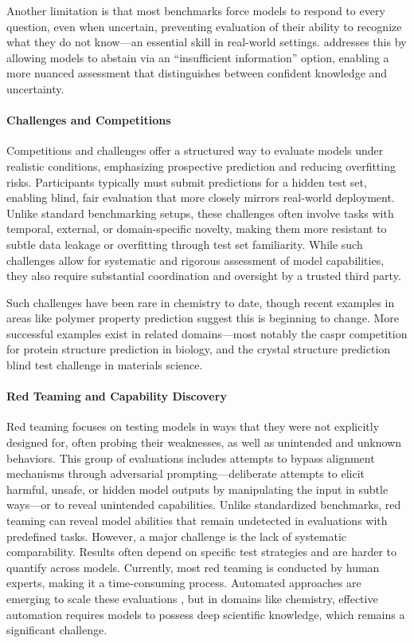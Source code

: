 Another limitation is that most benchmarks force models to respond to every question, even when uncertain, preventing evaluation of their ability to recognize what they do not know---an essential skill in real-world settings.  addresses this by allowing models to abstain via an \enquote{insufficient information} option, enabling a more nuanced assessment that distinguishes between confident knowledge and uncertainty.


\paragraph{Challenges and Competitions}
Competitions and challenges offer a structured way to evaluate models under realistic conditions, emphasizing prospective prediction and reducing overfitting risks.\autocite{Moult2005} 
Participants typically must submit predictions for a hidden test set, enabling blind, fair evaluation that more closely mirrors real-world deployment. Unlike standard benchmarking setups, these challenges often involve tasks with temporal, external, or domain-specific novelty, making them more resistant to subtle data leakage or overfitting through test set familiarity. 
While such challenges allow for systematic and rigorous assessment of model capabilities, they also require substantial coordination and oversight by a trusted third party.

Such challenges have been rare in chemistry to date, though recent examples in areas like polymer property prediction \autocite{gang2025neurips} suggest this is beginning to change. 
More successful examples exist in related domains---most notably the \gls{caspr} competition\autocite{Moult2005} for protein structure prediction in biology, and the crystal structure prediction blind test challenge\autocite{Lommerse2000} in materials science.

\paragraph{Red Teaming and Capability Discovery} \label{para:red_teaming}
Red teaming focuses on testing models in ways that they were not explicitly designed for, often probing their weaknesses, as well as unintended and unknown behaviors. \autocite{perez2022red, ganguli2022red} 
This group of evaluations includes attempts to bypass alignment mechanisms through adversarial prompting---deliberate attempts to elicit harmful, unsafe, or hidden model outputs by manipulating the input in subtle ways---or to reveal unintended capabilities. \autocite{zhu2023prompt, kumar2023computation} 
Unlike standardized benchmarks, red teaming can reveal model abilities that remain undetected in evaluations with predefined tasks. However, a major challenge is the lack of systematic comparability. 
Results often depend on specific test strategies and are harder to quantify across models. Currently, most red teaming is conducted by human experts, making it a time-consuming process. Automated approaches are emerging to scale these evaluations \autocite{ge2023mart0}, but in domains like chemistry, effective automation requires models to possess deep scientific knowledge, which remains a significant challenge. 

